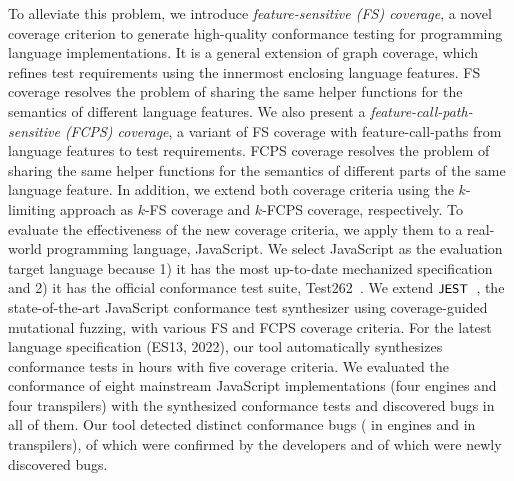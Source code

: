 To alleviate this problem, we introduce \textit{feature-sensitive (FS) coverage},
a novel coverage criterion to generate high-quality conformance testing for
programming language implementations. It is a general extension of graph coverage,
which refines test requirements using the innermost enclosing language features.
FS coverage resolves the problem of sharing the same helper functions
for the semantics of different language features.
We also present a \textit{feature-call-path-sensitive (FCPS) coverage},
a variant of FS coverage with feature-call-paths from language features to test requirements.
FCPS coverage resolves the problem of sharing the same helper functions
for the semantics of different parts of the same language feature.
In addition, we extend both coverage criteria using the $k$-limiting approach as $k$-FS
coverage and $k$-FCPS coverage, respectively.
To evaluate the effectiveness of the new coverage criteria,
we apply them to a real-world programming language, JavaScript.
We select JavaScript as the evaluation target language because
1) it has the most up-to-date mechanized specification and
2) it has the official conformance test suite, Test262~\cite{test262}.
We extend $\textsf{\small JEST}$~\cite{jest}, the state-of-the-art JavaScript conformance test
synthesizer using coverage-guided mutational fuzzing, with various FS
and FCPS coverage criteria.
For the latest language specification (ES13, 2022), our tool automatically
synthesizes  conformance tests in  hours with five coverage criteria.
We evaluated the conformance of eight mainstream JavaScript implementations
(four engines and four transpilers) with the synthesized conformance tests
and discovered bugs in all of them.
Our tool detected  distinct conformance bugs ( in engines
and  in transpilers),  of which were confirmed by
the developers and  of which were newly discovered bugs.


